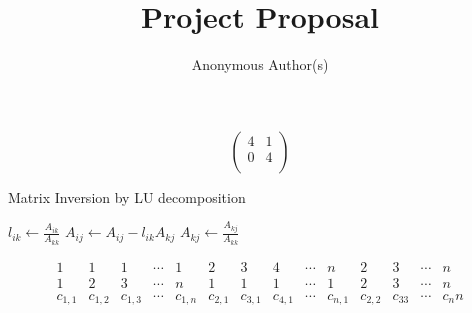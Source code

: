 \documentclass[11pt, a4paper]{article}
\title{Project Proposal
}
\author{Anonymous Author(s)}
\date{}
\begin{document}
\maketitle





\iffalse

%
%
\begin{figure}[H]
\label{fig:prob1fig}
\end{figure}

%
%
\[ \begin{pmatrix}
  4 & 1 \\
  0 & 4 \\
\end{pmatrix}\]

%
%
  \begin{algorithm}[H]
\caption{Matrix Inversion by LU decomposition}
\begin{algorithmic}
              \State $l_{ik} \leftarrow \frac{A_{ik}}{A_{kk}}$ 
                        \State $A_{ij} \leftarrow A_{ij} - l_{ik}A_{kj}$ 
                    \EndFor
                    \EndIf
                    \State $A_{kj} \leftarrow \frac{A_{kj}}{A_{kk}}$ 
                    \EndFor
      \EndFor
  \EndFor
\end{algorithmic}
\end{algorithm}

%
%
  \[
  \begin{smallmatrix}
    1 & 1 & 1 & \cdots & 1 & 2 & 3 & 4 & \cdots & n & 2 & 3 & \cdots &n\\
    1 & 2 & 3 & \cdots & n & 1 & 1 & 1 & \cdots & 1 & 2 & 3 & \cdots & n\\
    c_{1,1} & c_{1,2} & c_{1,3} & \cdots & c_{1,n} & c_{2,1} & c_{3,1} & c_{4,1} & \cdots & c_{n,1} & c_{2,2} & c_33 &\cdots &c_nn\\
  \end{smallmatrix}
\]

%
%
\noindent{}
\end{document}
